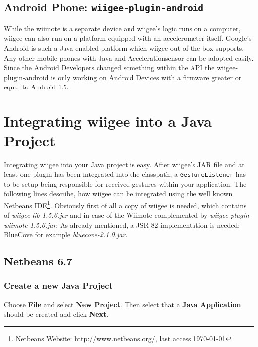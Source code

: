 \documentclass[%
   11pt,              %
   english,           %
   a4paper,           %
   DIV11,             %
   BCOR12mm,		  %
   titlepage,		  %
   bibtotoc,		  %
   liststotoc,		  %
   final,			  %
   twoside,			  %
   openright,		  %
   cleardoubleempty   %
]{scrreprt}%
\begin{document}
\section{Android Phone: \texttt{wiigee-plugin-android}}
While the wiimote is a separate device and wiigee's logic runs on a computer, wiigee can also run on a platform equipped with an accelerometer itself. Google's Android is such a Java-enabled platform which wiigee out-of-the-box supports. Any other mobile phones with Java and Accelerationsensor can be adopted easily. Since the Android Developers changed something within the API the wiigee-plugin-android is only working on Android Devices with a firmware greater or equal to Android 1.5.


\chapter{Integrating wiigee into a Java Project}
Integrating wiigee into your Java project is easy. After wiigee's JAR file and at least one plugin has been integrated into the classpath, a \texttt{GestureListener} has to be setup being responsible for received gestures within your application. The following lines describe, how wiigee can be integrated using the well known Netbeans IDE\footnote{Netbeans Website: \url{http://www.netbeans.org/}, last access \today}. Obviously first of all a copy of wiigee is needed, which contains of \textit{wiigee-lib-1.5.6.jar} and in case of the Wiimote complemented by \textit{wiigee-plugin-wiimote-1.5.6.jar}. As already mentioned, a JSR-82 implementation is needed: BlueCove for example \textit{bluecove-2.1.0.jar}.

\section{Netbeans 6.7}

\subsection{Create a new Java Project}
Choose \textbf{File} and select \textbf{New Project}. Then select that a \textbf{Java Application} should be created and click \textbf{Next}.
\end{document}
